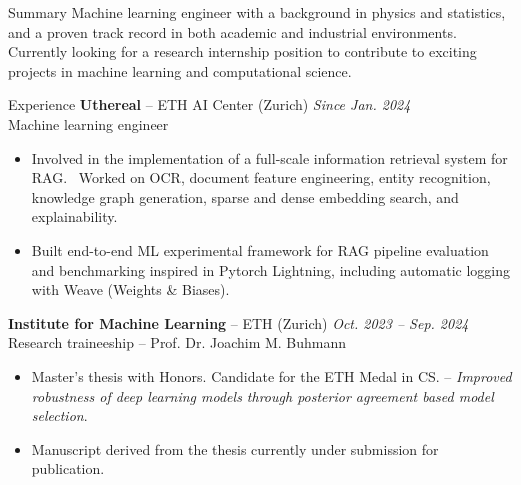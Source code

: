 \documentclass{resume} %
\begin{document}
\setlength{\baselineskip}{-0.2em}

\begin{rSection}{Summary}
    Machine learning engineer with a background in physics and statistics, and a proven track record in 
    both academic and industrial environments.
    Currently looking for a research internship position to contribute to exciting projects in machine learning 
    and computational science.
\end{rSection}



\begin{rSection}{Experience}
    {\bf Uthereal} -- ETH AI Center (Zurich) \hfill {\em Since Jan. 2024} 
    \\ Machine learning engineer \\
    \begin{itemize}
        \item Involved in the implementation of a full-scale information retrieval system for RAG. \
        Worked on OCR, document feature engineering, entity recognition, knowledge graph generation,
        sparse and dense embedding search, and explainability.
        \item Built end-to-end ML experimental framework for RAG pipeline evaluation and benchmarking inspired in Pytorch Lightning,
        including automatic logging with Weave (Weights \& Biases).
    \end{itemize}

    {\bf Institute for Machine Learning} -- ETH (Zurich) \hfill {\em Oct. 2023 -- Sep. 2024} 
    \\ Research traineeship -- Prof. Dr. Joachim M. Buhmann \\
    \begin{itemize}
        \item Master's thesis with Honors. Candidate for the ETH Medal in CS. -- \textit{Improved robustness of deep learning models through posterior agreement based model selection}.
        \item Manuscript derived from the thesis currently under submission for publication.
    \end{itemize}


\end{rSection}
\end{document}
